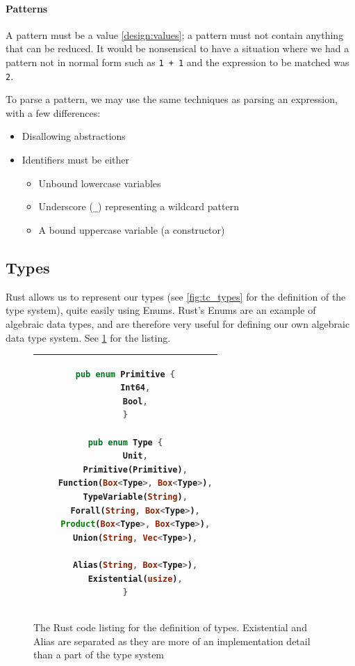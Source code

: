 \paragraph{Patterns}
\label{impl:parsing_patterns}
A pattern must be a value \ref{design:values}; a pattern must not contain anything that can be reduced. It would be nonsensical to have a situation where we had a pattern not in normal form such as \verb|1 + 1| and the expression to be matched was \verb|2|. 

To parse a pattern, we may use the same techniques as parsing an expression, with a few differences:
\begin{itemize}
    \item Disallowing abstractions
    \item Identifiers must be either
    \begin{itemize}
        \item Unbound lowercase variables
        \item Underscore (\verb|_|) representing a wildcard pattern
        \item A bound uppercase variable (a constructor)
    \end{itemize}
\end{itemize}

\subsection{Types}

Rust allows us to represent our types (see \ref{fig:tc_types} for the definition of the type system), quite easily using Enums. Rust's Enums are an example of algebraic data types, and are therefore very useful for defining our own algebraic data type system. See \ref{fig:type_lst} for the listing. 

\begin{figure}[ht]
    \centering
    \begin{tabular}{|c|}
    \hline
    \begin{lstlisting}[language=Rust]
pub enum Primitive {
    Int64,
    Bool,
}

pub enum Type {
    Unit,
    Primitive(Primitive),
    Function(Box<Type>, Box<Type>),
    TypeVariable(String),
    Forall(String, Box<Type>),
    Product(Box<Type>, Box<Type>),
    Union(String, Vec<Type>),

    Alias(String, Box<Type>),
    Existential(usize),
}
    \end{lstlisting}
    \\\hline
    \end{tabular}
    \caption{The Rust code listing for the definition of types. Existential and Alias are separated as they are more of an implementation detail than a part of the type system}
    \label{fig:type_lst}
\end{figure}


